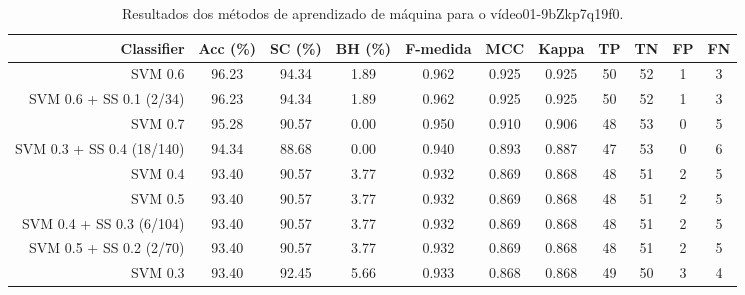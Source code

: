 \begin{table}[!htb]
\centering
\caption{Resultados dos métodos de aprendizado de máquina para o vídeo01-9bZkp7q19f0.}
\label{tab:01-9bZkp7q19f0}
\begin{tabular}{r|c|c|c|c|c|c|c|c|c|c}
\hline\hline
Classifier & Acc (\%) & SC (\%) & BH (\%) & F-medida & MCC & Kappa & TP & TN & FP & FN \\ \hline
SVM 0.6 & 96.23 & 94.34 & 1.89 & 0.962 & 0.925 & 0.925 & 50 & 52 & 1 & 3 \\ 
SVM 0.6 + SS 0.1 (2/34) & 96.23 & 94.34 & 1.89 & 0.962 & 0.925 & 0.925 & 50 & 52 & 1 & 3 \\ 
SVM 0.7 & 95.28 & 90.57 & 0.00 & 0.950 & 0.910 & 0.906 & 48 & 53 & 0 & 5 \\ 
SVM 0.3 + SS 0.4 (18/140) & 94.34 & 88.68 & 0.00 & 0.940 & 0.893 & 0.887 & 47 & 53 & 0 & 6 \\ 
SVM 0.4 & 93.40 & 90.57 & 3.77 & 0.932 & 0.869 & 0.868 & 48 & 51 & 2 & 5 \\ 
SVM 0.5 & 93.40 & 90.57 & 3.77 & 0.932 & 0.869 & 0.868 & 48 & 51 & 2 & 5 \\ 
SVM 0.4 + SS 0.3 (6/104) & 93.40 & 90.57 & 3.77 & 0.932 & 0.869 & 0.868 & 48 & 51 & 2 & 5 \\ 
SVM 0.5 + SS 0.2 (2/70) & 93.40 & 90.57 & 3.77 & 0.932 & 0.869 & 0.868 & 48 & 51 & 2 & 5 \\ 
SVM 0.3 & 93.40 & 92.45 & 5.66 & 0.933 & 0.868 & 0.868 & 49 & 50 & 3 & 4 \\ 
\hline\hline
\end{tabular}
\end{table}
